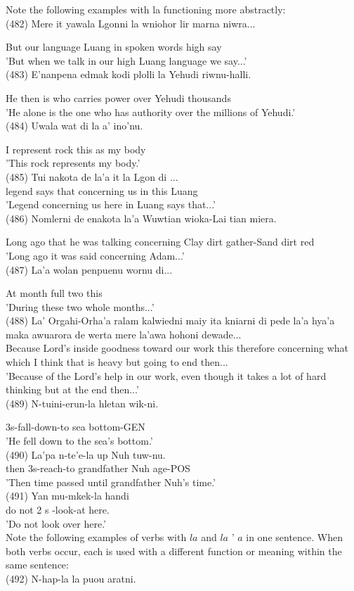 \documentclass[10pt]{article}
\begin{document}
Note the following examples with la functioning more abstractly:\\
(482) Mere it yawala Lgonni la wniohor lir marna niwra...

But our language Luang in spoken words high say\\
'But when we talk in our high Luang language we say...'\\
(483) E'nanpena edmak kodi plolli la Yehudi riwnu-halli.

He then is who carries power over Yehudi thousands\\
'He alone is the one who has authority over the millions of Yehudi.'\\
(484) Uwala wat di la a' ino'nu.

I represent rock this as my body\\
'This rock represents my body.'\\
(485) Tui nakota de la'a it la Lgon di ...\\
legend says that concerning us in this Luang\\
'Legend concerning us here in Luang says that...'\\
(486) Nomlerni de enakota la'a Wuwtian wioka-Lai tian miera.

Long ago that he was talking concerning Clay dirt gather-Sand dirt red\\
'Long ago it was said concerning Adam...'\\
(487) La'a wolan penpuenu wornu di...

At month full two this\\
'During these two whole months...'\\
(488) La' Orgahi-Orha'a ralam kalwiedni maiy ita kniarni di pede la'a hya'a maka awuarora de werta mere la'awa hohoni dewade...\\
Because Lord's inside goodness toward our work this therefore concerning what which I think that is heavy but going to end then...\\
'Because of the Lord's help in our work, even though it takes a lot of hard thinking but at the end then...'\\
(489) N-tuini-erun-la hletan wik-ni.

3s-fall-down-to sea bottom-GEN\\
'He fell down to the sea's bottom.'\\
(490) La'pa n-te'e-la up Nuh tuw-nu.\\
then 3s-reach-to grandfather Nuh age-POS\\
'Then time passed until grandfather Nuh's time.'\\
(491) Yan mu-mkek-la handi\\
do not 2 s -look-at here.\\
'Do not look over here.'\\
Note the following examples of verbs with \(l a\) and \(l a\) ' \(a\) in one sentence. When both verbs occur, each is used with a different function or meaning within the same sentence:\\
(492) N-hap-la la puou aratni.
\end{document}
